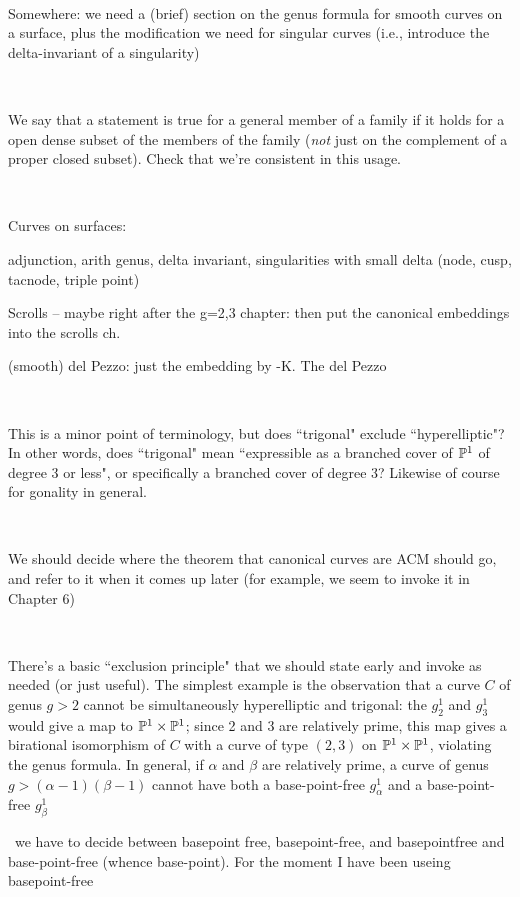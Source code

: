 \documentclass[12pt, leqno]{book}
\begin{document}
\

Somewhere: we need a (brief) section on the genus formula for smooth curves on a surface, plus the modification we need for singular curves (i.e., introduce the delta-invariant of a singularity)

\

We say that a statement is true for a general member of a family if it holds for a open dense subset of the members of the family (\emph{not} just on the complement of a proper closed subset). Check that we're consistent in this usage.

\

Curves on surfaces:

adjunction, arith genus, delta invariant, singularities with small delta (node, cusp, tacnode, triple point)

Scrolls -- maybe right after the g=2,3 chapter:   then put the canonical embeddings into the scrolls ch.

(smooth) del Pezzo: just the embedding by -K. The del Pezzo 

\

This is a minor point of terminology, but does ``trigonal" exclude ``hyperelliptic"? In other words, does ``trigonal" mean ``expressible as a branched cover of $\PP^1$ of degree 3 or less", or specifically a branched cover of degree 3? Likewise of course for gonality in general.

\

We should decide where the theorem that canonical curves are ACM should go, and refer to it when it comes up later (for example, we seem to invoke it in Chapter 6)

\

There's a basic ``exclusion principle" that we should state early and invoke as needed (or just useful). The simplest example is the observation that a curve $C$ of genus $g > 2$ cannot be simultaneously hyperelliptic and trigonal: the $g^1_2$ and $g^1_3$ would give a map to $\PP^1 \times \PP^1$; since 2 and 3 are relatively prime, this map gives a birational isomorphism of $C$ with a curve of type $(2,3)$ on $\PP^1 \times \PP^1$, violating the genus formula. In general, if $\alpha$ and $\beta$ are relatively prime, a curve of genus $g > (\alpha - 1)(\beta - 1)$ cannot have both a base-point-free $g^1_\alpha$ and a base-point-free $g^1_\beta$

\
we have to decide between basepoint free, basepoint-free, and basepointfree and base-point-free (whence base-point). For the moment I have been useing basepoint-free
\end{document}
